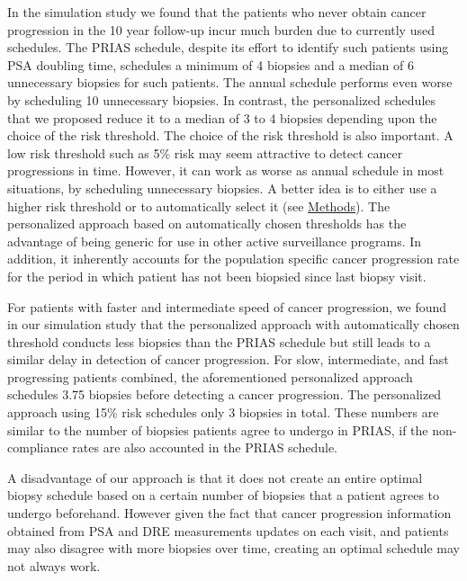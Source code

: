In the simulation study we found that the patients who never obtain cancer progression in the 10 year follow-up incur much burden due to currently used schedules. The PRIAS schedule, despite its effort to identify such patients using PSA doubling time, schedules a minimum of 4 biopsies and a median of 6 unnecessary biopsies for such patients. The annual schedule performs even worse by scheduling 10 unnecessary biopsies. In contrast, the personalized schedules that we proposed reduce it to a median of 3 to 4 biopsies depending upon the choice of the risk threshold. The choice of the risk threshold is also important. A low risk threshold such as 5\% risk may seem attractive to detect cancer progressions in time. However, it can work as worse as annual schedule in most situations, by scheduling unnecessary biopsies. A better idea is to either use a higher risk threshold or to automatically select it (see \hyperref[sec:methods]{Methods}). The personalized approach based on automatically chosen thresholds has the advantage of being generic for use in other active surveillance programs. In addition, it inherently accounts for the population specific cancer progression rate for the period in which patient has not been biopsied since last biopsy visit. 

For patients with faster and intermediate speed of cancer progression, we found in our simulation study that the personalized approach with automatically chosen threshold conducts less biopsies than the PRIAS schedule but still leads to a similar delay in detection of cancer progression. For slow, intermediate, and fast progressing patients combined, the aforementioned personalized approach schedules 3.75 biopsies before detecting a cancer progression. The personalized approach using 15\% risk schedules only 3 biopsies in total. These numbers are similar to the number of biopsies patients agree to undergo in PRIAS, if the non-compliance rates are also accounted in the PRIAS schedule. 

A disadvantage of our approach is that it does not create an entire optimal biopsy schedule based on a certain number of biopsies that a patient agrees to undergo beforehand. However given the fact that cancer progression information obtained from PSA and DRE measurements updates on each visit, and patients may also disagree with more biopsies over time, creating an optimal schedule may not always work.  
